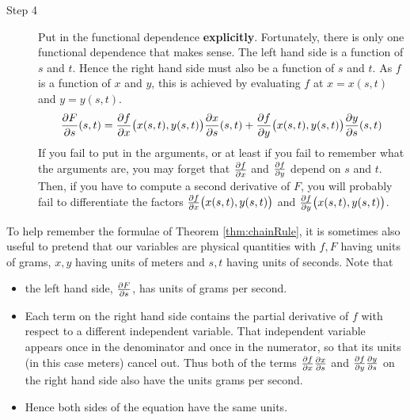 \begin{description}
\item[Step 4] 
Put in the functional dependence \textbf{explicitly}. Fortunately,
there is only one functional dependence that makes sense. 
The left hand side is a function of $s$ and $t$. Hence the
 right hand side must also be a function of $s$ and $t$. As $f$ is a
 function of $x$ and $y$, this is achieved by evaluating $f$ at $x=x(s,t)$
 and $y=y(s,t)$.
$$
\pdiff{F}{s}(s,t)=
  \pdiff{f}{x}\big(x(s,t),y(s,t)\big)
  \pdiff{x}{s}(s,t)
  +\pdiff{f}{y}\big(x(s,t),y(s,t)\big)
  \pdiff{y}{s}(s,t)
$$
If you fail to put in the arguments, or at least if you fail to remember
what the arguments are, you may forget that $\pdiff{f}{x}$ and $\pdiff{f}{y}$
depend on $s$ and $t$. Then, if you have to compute a second derivative of $F$,
you will probably fail to differentiate the factors  $\pdiff{f}{x}\big(x(s,t),y(s,t)\big)$ and
$\pdiff{f}{y}\big(x(s,t),y(s,t)\big)$.

\end{description}



To help remember the formulae of Theorem \ref{thm:chainRule}, it is sometimes 
also useful to pretend that our variables are physical quantities with 
$f,F$ having units of grams, $x,y$ having units of meters and $s,t$ having units of seconds. Note that
\begin{itemize}
\item 
the left hand side, $\pdiff{F}{s}$, has units of grams per second.
\item
Each term on the right hand side
contains the partial derivative of $f$ with respect to a different
 independent variable. That independent variable appears once in the
 denominator and once in the numerator, so that its units (in this case meters)
cancel out. Thus both of the terms $\pdiff{f}{x }\pdiff{x }{s}$
and $\pdiff{f}{y }\pdiff{y }{s}$ on the right hand side also have 
the units grams per second.

\item
Hence both sides of the equation have the same units.

\end{itemize}



